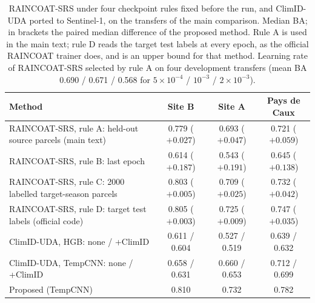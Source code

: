 \begin{table}[!t]
\caption{RAINCOAT-SRS under four checkpoint rules fixed before the run, and ClimID-UDA ported to Sentinel-1, on the transfers of the main
comparison. Median BA; in brackets the paired median difference of the proposed method. Rule A is used in the main text; rule D reads the
target test labels at every epoch, as the official RAINCOAT trainer does, and is an upper bound for that method. Learning rate of
RAINCOAT-SRS selected by rule A on four development transfers (mean BA 0.690 / 0.671 / 0.568 for $5\times10^{-4}$ / $10^{-3}$ / $2\times10^{-3}$).}
\label{tab:s_recent}
\centering\footnotesize
\begin{tabular}{@{}lccc@{}}
\toprule
Method & Site B & Site A & Pays de Caux\\
\midrule
RAINCOAT-SRS, rule A: held-out source parcels (main text) & 0.779 ($+0.027$) & 0.693 ($+0.047$) & 0.721 ($+0.059$)\\
RAINCOAT-SRS, rule B: last epoch & 0.614 ($+0.187$) & 0.543 ($+0.191$) & 0.645 ($+0.138$)\\
RAINCOAT-SRS, rule C: 2000 labelled target-season parcels & 0.803 ($+0.005$) & 0.709 ($+0.025$) & 0.732 ($+0.042$)\\
RAINCOAT-SRS, rule D: target test labels (official code) & 0.805 ($+0.003$) & 0.725 ($+0.009$) & 0.747 ($+0.035$)\\
ClimID-UDA, HGB: none / +ClimID & 0.611 / 0.604 & 0.527 / 0.519 & 0.639 / 0.632\\
ClimID-UDA, TempCNN: none / +ClimID & 0.658 / 0.631 & 0.660 / 0.653 & 0.712 / 0.699\\
Proposed (TempCNN) & 0.810 & 0.732 & 0.782\\
\bottomrule
\end{tabular}
\end{table}
